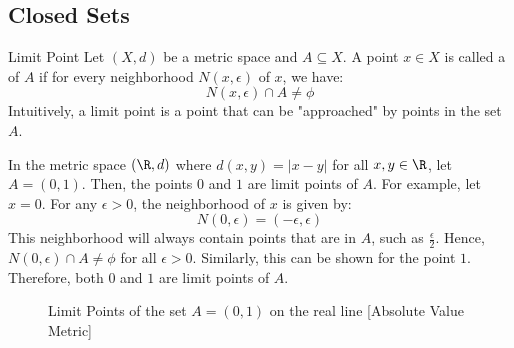 \documentclass[openany]{book}
\begin{document}
\subsection{Closed Sets}
\begin{mydefinition}{Limit Point}
    Let $(X, d)$ be a metric space and $A \subseteq X$. A point $x \in X$ is called a  of $A$ if for every neighborhood $N(x, \epsilon)$ of $x$, we have:
    $$N(x, \epsilon) \cap A \neq \phi$$
    Intuitively, a limit point is a point that can be "approached" by points in the set $A$.
\end{mydefinition}
\begin{example}
    In the metric space $(\R, d)$ where $d(x, y) = |x - y|$ for all $x, y \in \R$, let $A = (0, 1)$. Then, the points $0$ and $1$ are limit points of $A$. For example, let $x = 0$. For any $\epsilon > 0$, the neighborhood of $x$ is given by:
    $$N(0, \epsilon) = (-\epsilon, \epsilon)$$
    This neighborhood will always contain points that are in $A$, such as $\frac{\epsilon}{2}$. Hence, $N(0, \epsilon) \cap A \neq \phi$ for all $\epsilon > 0$. Similarly, this can be shown for the point $1$. Therefore, both $0$ and $1$ are limit points of $A$.
\end{example}
\begin{figure}[H]
    \centering
    \caption{Limit Points of the set $A = (0, 1)$ on the real line [Absolute Value Metric]}
\end{figure}
\end{document}
